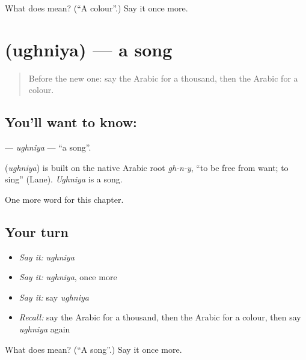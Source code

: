 \begin{tcolorbox}[breakable,colback=teal!4,colframe=teal!35!black,title={Before you move on}]
What does  mean? (\textquotedblleft{}A colour\textquotedblright{}.) Say it once more.
\end{tcolorbox}
\section[\texorpdfstring{\ar{أغنية} (ughniya)}{أغنية (ughniya)}]{ (ughniya) — a song}

\label{lesson:AR-C98-ughniya}



\begin{quote}
Before the new one: say the Arabic for a thousand, then the Arabic for a colour.
\end{quote}

\subsection*{You'll want to know: }
\textbf{} — \emph{ughniya} — \textquotedblleft{}a song\textquotedblright{}.

\begin{cousinweb}
\textbf{} (\emph{ughniya}) is built on the native Arabic root \emph{gh-n-y}, \textquotedblleft{}to be free from want; to sing\textquotedblright{} (Lane). \emph{Ughniya} is a song.
\end{cousinweb}

\begin{grammarlens}[title={What you've built}]
One more word for this chapter.
\end{grammarlens}

\subsection*{Your turn}
\begin{itemize}
\raggedright
  \item \emph{Say it:} \emph{ughniya}
  \item \emph{Say it:} \emph{ughniya}, once more
  \item \emph{Say it:} say \emph{ughniya}
  \item \emph{Recall:} say the Arabic for a thousand, then the Arabic for a colour, then say \emph{ughniya} again
\end{itemize}

\begin{tcolorbox}[breakable,colback=teal!4,colframe=teal!35!black,title={Before you move on}]
What does  mean? (\textquotedblleft{}A song\textquotedblright{}.) Say it once more.
\end{tcolorbox}
